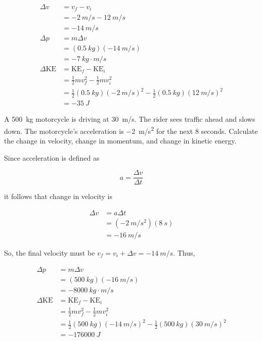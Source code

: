 \documentclass[]{exam}
\begin{document}
\begin{questions}
\begin{solution}
\begin{align*}
    \Delta v &= v_f - v_i \\[1ex]
    &= \SI{-2}{m/s} - \SI{12}{m/s} \\[1ex]
    &= \boxed{\SI{-14}{m/s}} \\[2ex]
    \Delta p &= m \Delta v \\[1ex]
    &= (\SI{0.5}{kg})(\SI{-14}{m/s}) \\[1ex]
    &= \boxed{\SI{-7}{kg\cdot m/s}} \\[2ex]
    \Delta \mathrm{KE} &= \mathrm{KE}_f - \mathrm{KE}_i \\[1ex]
    &= \frac{1}{2}m v_f^2 - \frac{1}{2}mv_i^2 \\[1ex]
    &= \frac{1}{2}(\SI{0.5}{kg})(\SI{-2}{m/s})^2 - \frac{1}{2}(\SI{0.5}{kg}) (\SI{12}{m/s})^2 \\[1ex]
    &= \boxed{\SI{-35}{J}}
\end{align*}
\end{solution}

\ifprintanswers
    \clearpage
\fi

\question
A \SI{500}{kg} motorcycle is driving at \SI{30}{m/s}. The rider sees traffic ahead and slows down. The motorcycle's acceleration is \SI{-2}{m/s^2} for the next 8 seconds. Calculate the change in velocity, change in momentum, and change in kinetic energy. 


\begin{solution}
Since acceleration is defined as

\begin{equation*}
    a = \frac{\Delta v}{\Delta t}
\end{equation*}

it follows that change in velocity is

\vspace{-1em}
\begin{align*}
    \Delta v &= a \Delta t \\[1ex]
    &= (\SI{-2}{m/s^2})(\SI{8}{s}) \\[1ex]
    &= \boxed{\SI{-16}{m/s}}
\end{align*}
\vspace{-1em}

So, the final velocity must be $v_f = v_i + \Delta v = \SI{-14}{m/s}$. Thus,

\begin{align*}
    \Delta p &= m \Delta v \\[1ex]
    &= (\SI{500}{kg})(\SI{-16}{m/s}) \\[1ex]
    &= \boxed{\SI{-8000}{kg\cdot m/s}} \\[2ex]
    \Delta \mathrm{KE} &= \mathrm{KE}_f - \mathrm{KE}_i \\[1ex]
    &= \frac{1}{2}m v_f^2 - \frac{1}{2}mv_i^2 \\[1ex]
    &= \frac{1}{2}(\SI{500}{kg})(\SI{-14}{m/s})^2 - \frac{1}{2}(\SI{500}{kg}) (\SI{30}{m/s})^2 \\[1ex]
    &= \boxed{\SI{-176000}{J}}
\end{align*}
\end{solution}




\end{questions}
\end{document}
